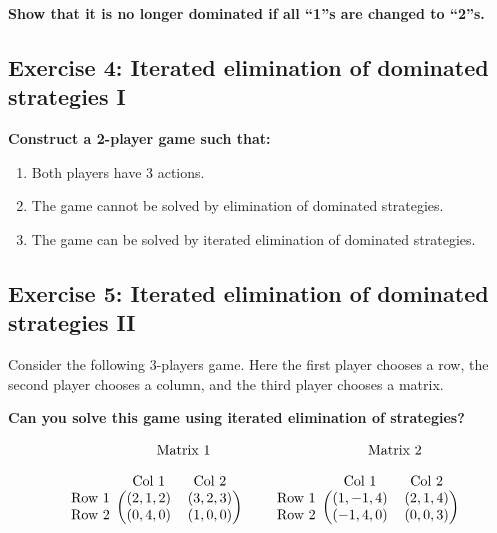 \documentclass[10pt]{article}
\begin{document}
\textbf{Show that it is no longer dominated if all ``1''s are changed to ``2''s.}

\subsection*{Exercise 4: Iterated elimination of dominated strategies I}

\textbf{Construct a 2-player game such that:}

\begin{enumerate}
    \item Both players have 3 actions.
    \item The game cannot be solved by elimination of dominated strategies.
    \item The game can be solved by iterated elimination of dominated strategies.
\end{enumerate}

\subsection*{Exercise 5: Iterated elimination of dominated strategies II}
Consider the following 3-players game. Here the first player chooses a row,
the second player chooses a column, and the third player chooses a matrix.

\textbf{Can you solve this game using iterated elimination of strategies?}

\begin{equation*}
\begin{blockarray}{ccc}
    & \BAmulticolumn{2}{c}{\text{Matrix } 1} \\ [1em]
    & \text{Col } 1 & \text{Col } 2 \\
    \begin{block}{c(cc)}
        \text{Row } 1 & (2, 1, 2) & (3, 2, 3) \\
        \text{Row } 2 & (0, 4, 0) & (1, 0, 0) \\
    \end{block}
\end{blockarray}\qquad
%
\begin{blockarray}{ccc}
    & \BAmulticolumn{2}{c}{\text{Matrix } 2} \\ [1em]
    & \text{Col } 1 & \text{Col } 2 \\
    \begin{block}{c(cc)}
        \text{Row } 1 & (1, -1, 4) & (2, 1, 4) \\
        \text{Row } 2 & (-1, 4, 0) & (0, 0, 3) \\
    \end{block}
\end{blockarray}
\end{equation*}
\end{document}
